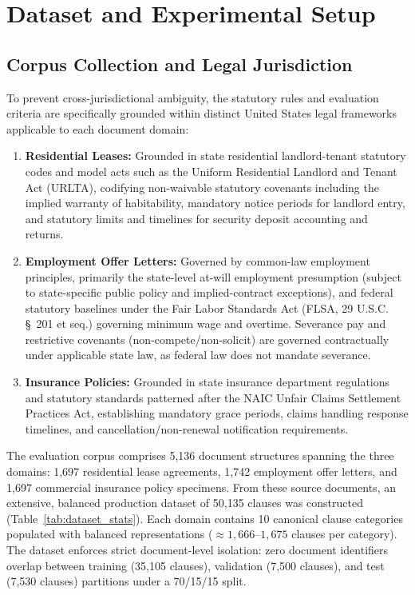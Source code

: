 \documentclass[conference]{IEEEtran}
\begin{document}


\section{Dataset and Experimental Setup}
\label{sec:dataset}
\subsection{Corpus Collection and Legal Jurisdiction}
To prevent cross-jurisdictional ambiguity, the statutory rules and evaluation criteria are specifically grounded within distinct United States legal frameworks applicable to each document domain:
\begin{enumerate}
    \item \textbf{Residential Leases:} Grounded in state residential landlord-tenant statutory codes and model acts such as the Uniform Residential Landlord and Tenant Act (URLTA), codifying non-waivable statutory covenants including the implied warranty of habitability, mandatory notice periods for landlord entry, and statutory limits and timelines for security deposit accounting and returns.
    \item \textbf{Employment Offer Letters:} Governed by common-law employment principles, primarily the state-level at-will employment presumption (subject to state-specific public policy and implied-contract exceptions), and federal statutory baselines under the Fair Labor Standards Act (FLSA, 29 U.S.C. \S\ 201 et seq.) governing minimum wage and overtime. Severance pay and restrictive covenants (non-compete/non-solicit) are governed contractually under applicable state law, as federal law does not mandate severance.
    \item \textbf{Insurance Policies:} Grounded in state insurance department regulations and statutory standards patterned after the NAIC Unfair Claims Settlement Practices Act, establishing mandatory grace periods, claims handling response timelines, and cancellation/non-renewal notification requirements.
\end{enumerate}

The evaluation corpus comprises 5,136 document structures spanning the three domains: 1,697 residential lease agreements, 1,742 employment offer letters, and 1,697 commercial insurance policy specimens. From these source documents, an extensive, balanced production dataset of 50,135 clauses was constructed (Table~\ref{tab:dataset_stats}). Each domain contains 10 canonical clause categories populated with balanced representations ($\approx 1,666\text{--}1,675$ clauses per category). The dataset enforces strict document-level isolation: zero document identifiers overlap between training (35,105 clauses), validation (7,500 clauses), and test (7,530 clauses) partitions under a 70/15/15 split.
\end{document}
